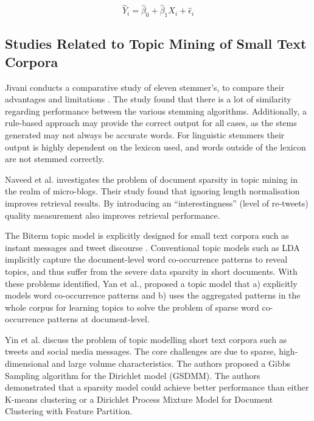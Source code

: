 \begin{equation}
\hat{Y}_i = \hat{\beta}_0 + \hat{\beta}_1 X_i + \hat{\epsilon}_i
\end{equation}

\subsection{Studies Related to Topic Mining of Small Text Corpora}

Jivani conducts a comparative study of eleven stemmer's, to compare their advantages and limitations \cite{jivani2011comparative}. The study found that there is a lot of similarity regarding performance between the various stemming algorithms. Additionally, a rule-based approach may provide the correct output for all cases, as the stems generated may not always be accurate words. For linguistic stemmers their output is highly dependent on the lexicon used, and words outside of the lexicon are not stemmed correctly.

Naveed et al. \cite{naveed2011searching} investigates the problem of document sparsity in topic mining in the realm of micro-blogs. Their study found that ignoring length normalisation improves retrieval results. By introducing an ``interestingness'' (level of re-tweets) quality measurement also improves retrieval performance. 

The Biterm topic model is explicitly designed for small text corpora such as instant messages and tweet discourse \cite{yan2013biterm}. Conventional topic models such as LDA implicitly capture the document-level word co-occurrence patterns to reveal topics, and thus suffer from the severe data sparsity in short documents. With these problems identified, Yan et al., proposed a topic model that a) explicitly models word co-occurrence patterns and b) uses the aggregated patterns in the whole corpus for learning topics to solve the problem of sparse word co-occurrence patterns at document-level. 

Yin et al. \cite{yin2014dirichlet} discuss the problem of topic modelling short text corpora such as tweets and social media messages. The core challenges are due to sparse, high-dimensional and large volume characteristics. The authors proposed a Gibbs Sampling algorithm for the Dirichlet model (GSDMM). The authors demonstrated that a sparsity model could achieve better performance than either K-means clustering or a Dirichlet Process Mixture Model for Document Clustering with Feature Partition.


